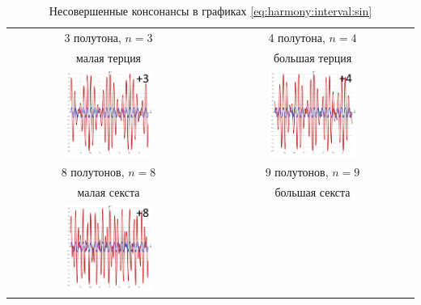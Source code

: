 \begin{table}[!ht]
    \caption{Несовершенные консонансы в графиках \eqref{eq:harmony:interval:sin}}
    \label{t:harmony:interval:conso-3-4-8-9}
    \centering
    \begin{tabular}{c|c}
        \hline\hline
        3 полутона, $n=3$   & 4 полутона, $n=4$ \\
        малая терция        & большая терция \\
        \includegraphics[width=0.45\textwidth]{fig/intervals/i03}
            & \includegraphics[width=0.45\textwidth]{fig/intervals/i04} \\
        \hline\hline
        8 полутонов, $n=8$  & 9 полутонов, $n=9$ \\
        малая секста        & большая секста \\
        \includegraphics[width=0.45\textwidth]{fig/intervals/i08}

\end{tabular}
\end{table}
